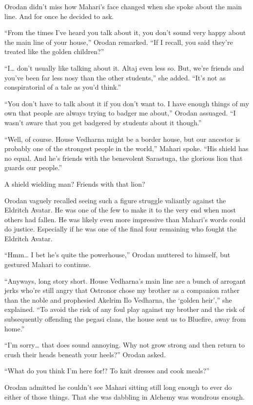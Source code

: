 \documentclass[a4paper,10pt]{book}
\begin{document}
Orodan didn’t miss how Mahari’s face changed when she spoke about the main line. And for once he decided to ask.\par
“From the times I’ve heard you talk about it, you don’t sound very happy about the main line of your house,” Orodan remarked. “If I recall, you said they’re treated like the golden children?”\par
“I… don’t usually like talking about it. Altaj even less so. But, we’re friends and you’ve been far less nosy than the other students,” she added. “It’s not as conspiratorial of a tale as you’d think.”\par
“You don’t have to talk about it if you don’t want to. I have enough things of my own that people are always trying to badger me about,” Orodan assuaged. “I wasn’t aware that you get badgered by students about it though.”\par
“Well, of course. House Vedharna might be a border house, but our ancestor is probably one of the strongest people in the world,” Mahari spoke. “His shield has no equal. And he’s friends with the benevolent Sarastuga, the glorious lion that guards our people.”\par
A shield wielding man? Friends with that lion?\par
Orodan vaguely recalled seeing such a figure struggle valiantly against the Eldritch Avatar. He was one of the few to make it to the very end when most others had fallen. He was likely even more impressive than Mahari’s words could do justice. Especially if he was one of the final four remaining who fought the Eldritch Avatar.\par
“Hmm… I bet he’s quite the powerhouse,” Orodan muttered to himself, but gestured Mahari to continue.\par
“Anyways, long story short. House Vedharna’s main line are a bunch of arrogant jerks who’re still angry that Ostronor chose my brother as a companion rather than the noble and prophesied Akelrim Ilo Vedharna, the ‘golden heir’,” she explained. “To avoid the risk of any foul play against my brother and the risk of subsequently offending the pegasi clans, the house sent us to Bluefire, away from home.”\par
“I’m sorry… that does sound annoying. Why not grow strong and then return to crush their heads beneath your heels?” Orodan asked.\par
“What do you think I’m here for!? To knit dresses and cook meals?”\par
Orodan admitted he couldn’t see Mahari sitting still long enough to ever do either of those things. That she was dabbling in Alchemy was wondrous enough.\par
\end{document}
